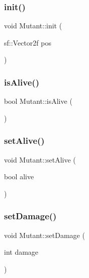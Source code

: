\mbox{\label{class_mutant_a43fe449ecbb708a19095cd030b399cee}} 
\subsubsection{\texorpdfstring{init()}{init()}}
{\footnotesize\ttfamily void Mutant\+::init (\begin{DoxyParamCaption}\item[{sf\+::\+Vector2f}]{pos }\end{DoxyParamCaption})}

\mbox{\label{class_mutant_ab92626e4168187b7bf49073e0626e071}} 
\subsubsection{\texorpdfstring{is\+Alive()}{isAlive()}}
{\footnotesize\ttfamily bool Mutant\+::is\+Alive (\begin{DoxyParamCaption}{ }\end{DoxyParamCaption})}

\mbox{\label{class_mutant_ae31d5187569549ce0c6346c8bef31bd4}} 
\subsubsection{\texorpdfstring{set\+Alive()}{setAlive()}}
{\footnotesize\ttfamily void Mutant\+::set\+Alive (\begin{DoxyParamCaption}\item[{bool}]{alive }\end{DoxyParamCaption})}

\mbox{\label{class_mutant_a7632057c37a56ed27df3d692b5357c6a}} 
\subsubsection{\texorpdfstring{set\+Damage()}{setDamage()}}
{\footnotesize\ttfamily void Mutant\+::set\+Damage (\begin{DoxyParamCaption}\item[{int}]{damage }\end{DoxyParamCaption})}

